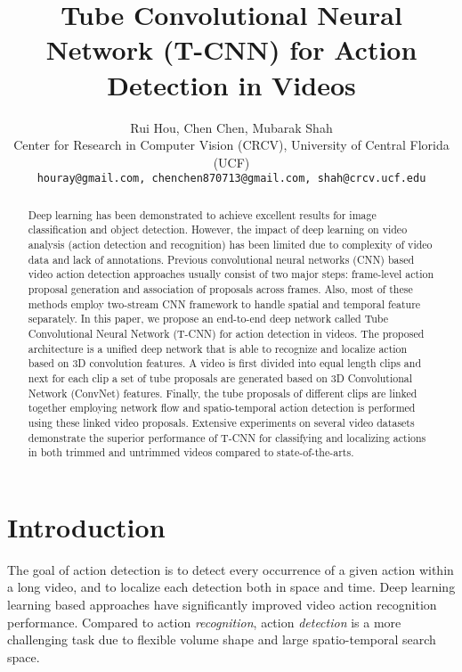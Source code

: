 \documentclass[10pt,twocolumn,letterpaper]{article}
\begin{document}
\title{Tube Convolutional Neural Network (T-CNN) for Action Detection in Videos}

\author{Rui Hou, Chen Chen, Mubarak Shah\\
Center for Research in Computer Vision (CRCV), University of Central Florida (UCF)\\
{\tt\small houray@gmail.com, chenchen870713@gmail.com, shah@crcv.ucf.edu}
}

\maketitle



\begin{abstract}
Deep learning has been demonstrated to achieve excellent results for image classification and object detection.
However, the impact of deep learning on video analysis (\eg action detection and recognition) has been limited due to complexity of video data and lack of annotations. Previous convolutional neural networks (CNN) based video action detection approaches usually consist of two major steps: frame-level action proposal generation and association of proposals across frames. Also, most of these methods employ two-stream CNN framework to handle spatial and temporal feature separately.  In this paper, we propose an end-to-end deep network called Tube Convolutional Neural Network (T-CNN) for action detection in videos. The proposed architecture is a unified deep network that is able to recognize and localize action based on 3D convolution features.
A video is first divided into equal length clips and next for each clip a set of tube proposals are generated  based on 3D Convolutional Network (ConvNet) features. Finally, the tube proposals of different clips are linked together employing network flow and spatio-temporal action detection is performed using these linked video proposals.
Extensive experiments on several video datasets demonstrate the superior performance  of T-CNN for classifying and localizing actions in both trimmed and untrimmed videos compared to state-of-the-arts.

\end{abstract}
	
\section{Introduction}
The goal of action detection is to detect every occurrence of a given action within a long video, and to localize each detection both in space and time. Deep learning learning based approaches have significantly improved video action recognition performance. Compared to action {\em recognition}, action {\em detection} is a more challenging task due to flexible volume shape and large spatio-temporal search space.
\end{document}
